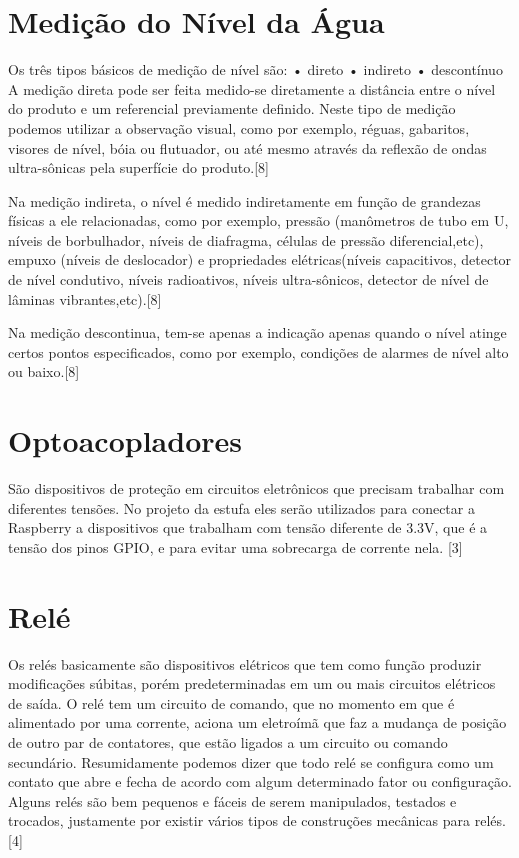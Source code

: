 \section{Medição do Nível da Água}

Os três tipos básicos de medição de nível são:
• direto
• indireto
• descontínuo
A medição direta pode ser feita medido-se diretamente a distância entre o nível do produto e um referencial previamente definido. Neste tipo de medição podemos utilizar a observação visual, como por exemplo, réguas, gabaritos, visores de nível, bóia ou flutuador, ou até mesmo através da reflexão de ondas ultra-sônicas pela superfície do produto\cite{cassiolato2010}.[8]

Na medição indireta, o nível é medido indiretamente em função de grandezas físicas a ele relacionadas, como por exemplo, pressão (manômetros de tubo em U, níveis de borbulhador, níveis de diafragma, células de pressão diferencial,etc), empuxo (níveis de deslocador) e propriedades elétricas(níveis capacitivos, detector de nível condutivo, níveis radioativos, níveis ultra-sônicos, detector de nível de lâminas vibrantes,etc)\cite{cassiolato2010}.[8]

Na medição descontinua, tem-se apenas a indicação apenas quando o nível atinge certos pontos especificados, como por exemplo, condições de alarmes de nível alto ou baixo\cite{cassiolato2010}.[8]

\section{Optoacopladores}

São dispositivos de proteção em circuitos eletrônicos que precisam trabalhar com diferentes tensões. No projeto da estufa eles serão utilizados para conectar a Raspberry a dispositivos que trabalham com tensão diferente de 3.3V, que é a tensão dos pinos GPIO, e para evitar uma sobrecarga de corrente nela. \cite{vishay} [3]

\section{Relé}

Os relés basicamente são dispositivos elétricos que tem como função produzir modificações súbitas, porém predeterminadas em um ou mais circuitos elétricos de saída. O relé tem um circuito de comando, que no momento em que é alimentado por uma corrente, aciona um eletroímã que faz a mudança de posição de outro par de contatores, que estão ligados a um circuito ou comando secundário. Resumidamente podemos dizer que todo relé se configura como um contato que abre e fecha de acordo com algum determinado fator ou configuração. Alguns relés são bem pequenos e fáceis de serem manipulados, testados e trocados, justamente por existir vários tipos de construções mecânicas para relés\cite{braga2012}. [4]

